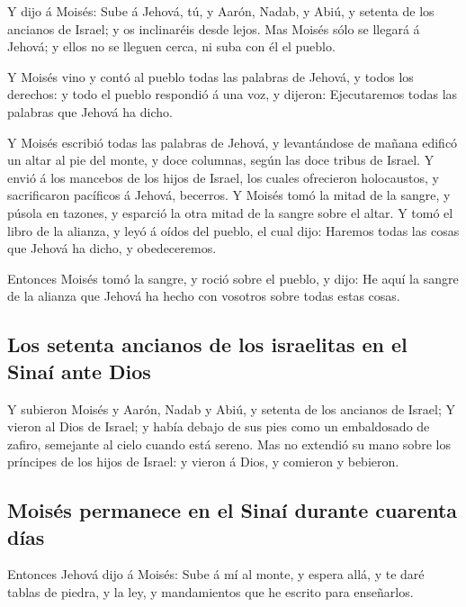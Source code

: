  Y dijo á Moisés: Sube á Jehová, tú, y Aarón, Nadab, y Abiú,
y setenta de los ancianos de Israel; y os inclinaréis desde lejos.
 Mas Moisés sólo se llegará á Jehová; y ellos no se lleguen
cerca, ni suba con él el pueblo.

 Y Moisés vino y contó al pueblo todas las palabras de
Jehová, y todos los derechos: y todo el pueblo respondió á una voz, y
dijeron: Ejecutaremos todas las palabras que Jehová ha dicho.

 Y Moisés escribió todas las palabras de Jehová, y
levantándose de mañana edificó un altar al pie del monte, y doce
columnas, según las doce tribus de Israel.  Y envió á los
mancebos de los hijos de Israel, los cuales ofrecieron holocaustos, y
sacrificaron pacíficos á Jehová, becerros.  Y Moisés tomó la
mitad de la sangre, y púsola en tazones, y esparció la otra mitad de la
sangre sobre el altar.  Y tomó el libro de la alianza, y
leyó á oídos del pueblo, el cual dijo: Haremos todas las cosas que
Jehová ha dicho, y obedeceremos.

 Entonces Moisés tomó la sangre, y roció sobre el pueblo, y
dijo: He aquí la sangre de la alianza que Jehová ha hecho con vosotros
sobre todas estas cosas.

\hypertarget{los-setenta-ancianos-de-los-israelitas-en-el-sinauxed-ante-dios}{%
\subsection{Los setenta ancianos de los israelitas en el Sinaí ante
Dios}\label{los-setenta-ancianos-de-los-israelitas-en-el-sinauxed-ante-dios}}

 Y subieron Moisés y Aarón, Nadab y Abiú, y setenta de los
ancianos de Israel;  Y vieron al Dios de Israel; y había
debajo de sus pies como un embaldosado de zafiro, semejante al cielo
cuando está sereno.  Mas no extendió su mano sobre los
príncipes de los hijos de Israel: y vieron á Dios, y comieron y
bebieron.

\hypertarget{moisuxe9s-permanece-en-el-sinauxed-durante-cuarenta-duxedas}{%
\subsection{Moisés permanece en el Sinaí durante cuarenta
días}\label{moisuxe9s-permanece-en-el-sinauxed-durante-cuarenta-duxedas}}

 Entonces Jehová dijo á Moisés: Sube á mí al monte, y
espera allá, y te daré tablas de piedra, y la ley, y mandamientos que he
escrito para enseñarlos.

